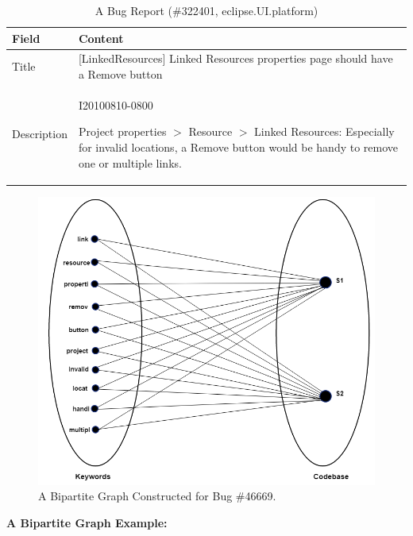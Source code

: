 \documentclass[conference]{IEEEtran}
\begin{document}
\begin{table}[htbp]
	\caption{A Bug Report (\#322401, eclipse.UI.platform)}
	\label{tab:BugInfo2}
	\begin{center}
		\begin{tabular}{ p{1.5cm} | p{6cm}}
			\hline
			\textbf{Field}  & \textbf{Content} \\
			\hline
			\hline Title &
		[LinkedResources] Linked Resources properties page should have a Remove button
			\\ \hline
		   Description &  I20100810-0800
		   
		   Project properties $>$ Resource $>$ Linked Resources:
		   Especially for invalid locations, a Remove button would be handy to remove one or multiple links. \\
			\hline
		\end{tabular}
	\end{center}
\end{table}
\begin{figure}
	\centering
	\includegraphics[scale=0.53]{BGraph2}
	\caption{A Bipartite Graph Constructed for Bug \#46669. 
	}
	\label{fig:BipartiteGraph}
\end{figure}

\textbf{A Bipartite Graph Example:}
\end{document}
